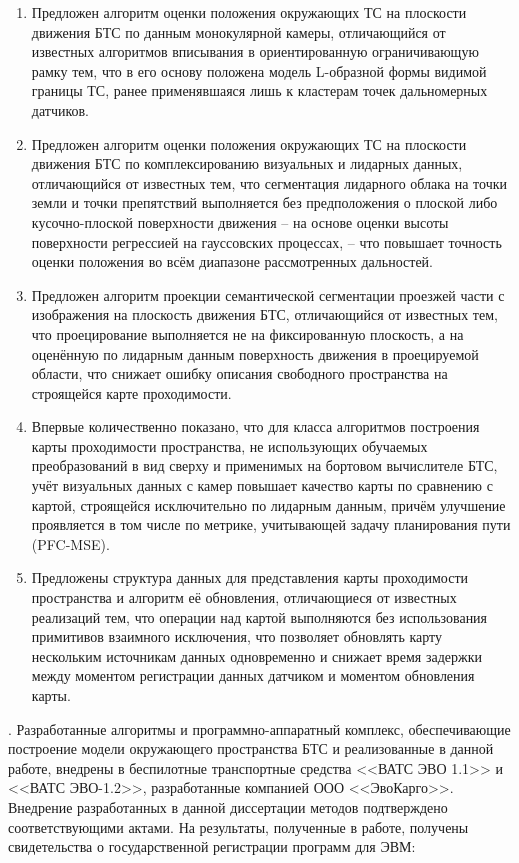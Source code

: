 {\novelty}
\begin{enumerate}[beginpenalty=10000] %
  \item Предложен алгоритм оценки положения окружающих ТС на плоскости движения БТС по данным монокулярной камеры, отличающийся от известных алгоритмов вписывания в ориентированную ограничивающую рамку тем, что в его основу положена модель L-образной формы видимой границы ТС, ранее применявшаяся лишь к кластерам точек дальномерных датчиков.
  \item Предложен алгоритм оценки положения окружающих ТС на плоскости движения БТС по комплексированию визуальных и лидарных данных, отличающийся от известных тем, что сегментация лидарного облака на точки земли и точки препятствий выполняется без предположения о плоской либо кусочно-плоской поверхности движения -- на основе оценки высоты поверхности регрессией на гауссовских процессах, -- что повышает точность оценки положения во всём диапазоне рассмотренных дальностей.
  \item Предложен алгоритм проекции семантической сегментации проезжей части с изображения на плоскость движения БТС, отличающийся от известных тем, что проецирование выполняется не на фиксированную плоскость, а на оценённую по лидарным данным поверхность движения в проецируемой области, что снижает ошибку описания свободного пространства на строящейся карте проходимости.
  \item Впервые количественно показано, что для класса алгоритмов построения карты проходимости пространства, не использующих обучаемых преобразований в вид сверху и применимых на бортовом вычислителе БТС, учёт визуальных данных с камер повышает качество карты по сравнению с картой, строящейся исключительно по лидарным данным, причём улучшение проявляется в том числе по метрике, учитывающей задачу планирования пути (PFC-MSE).
  \item Предложены структура данных для представления карты проходимости пространства и алгоритм её обновления, отличающиеся от известных реализаций тем, что операции над картой выполняются без использования примитивов взаимного исключения, что позволяет обновлять карту нескольким источникам данных одновременно и снижает время задержки между моментом регистрации данных датчиком и моментом обновления карты.
\end{enumerate}

{\influence}. Разработанные алгоритмы и программно-аппаратный комплекс, обеспечивающие построение модели окружающего пространства БТС и реализованные в данной работе, внедрены в беспилотные транспортные средства <<ВАТС  ЭВО 1.1>> и <<ВАТС  ЭВО-1.2>>, разработанные компанией ООО <<ЭвоКарго>>. Внедрение разработанных в данной диссертации методов подтверждено соответствующими актами. На результаты, полученные в работе, получены свидетельства о государственной регистрации программ для ЭВМ:

